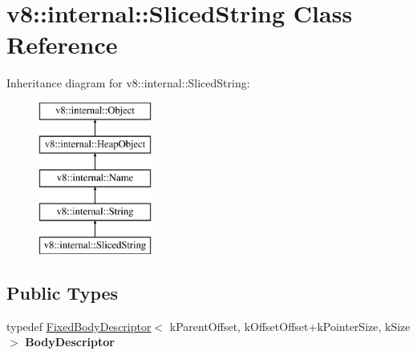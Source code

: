 \hypertarget{classv8_1_1internal_1_1_sliced_string}{}\section{v8\+:\+:internal\+:\+:Sliced\+String Class Reference}
\label{classv8_1_1internal_1_1_sliced_string}
Inheritance diagram for v8\+:\+:internal\+:\+:Sliced\+String\+:\begin{figure}[H]
\begin{center}
\leavevmode
\includegraphics[height=5.000000cm]{classv8_1_1internal_1_1_sliced_string}
\end{center}
\end{figure}
\subsection*{Public Types}
\begin{DoxyCompactItemize}
\item 
\hypertarget{classv8_1_1internal_1_1_sliced_string_ac5dbb8e762551faed83b5bacbb93cc78}{}typedef \hyperlink{classv8_1_1internal_1_1_fixed_body_descriptor}{Fixed\+Body\+Descriptor}$<$ k\+Parent\+Offset, k\+Offset\+Offset+k\+Pointer\+Size, k\+Size $>$ {\bfseries Body\+Descriptor}\label{classv8_1_1internal_1_1_sliced_string_ac5dbb8e762551faed83b5bacbb93cc78}

\end{DoxyCompactItemize}
